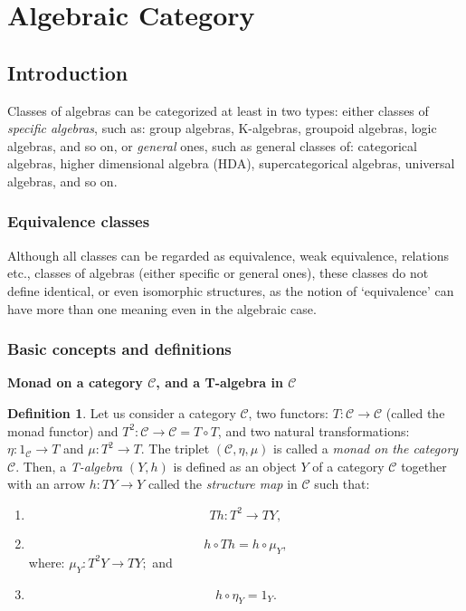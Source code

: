 \documentclass[12pt]{article}
\theoremstyle{plain}
\theoremstyle{definition}
\newtheorem{definition}{Definition}[section]
\numberwithin{equation}{section}
\begin{document}
\section{Algebraic Category}

\subsection{Introduction}
Classes of algebras can be categorized at least in two types: either classes of \emph{specific
algebras}, such as: group algebras, K-algebras, groupoid algebras, logic algebras, and so on,
or \emph{general} ones, such as general classes of: categorical algebras, higher dimensional algebra
(HDA), supercategorical algebras, universal algebras, and so on.
\subsubsection{Equivalence classes}
Although all classes can be regarded as equivalence, weak equivalence, relations etc., classes of
algebras (either specific or general ones), these classes do not define identical, or even isomorphic structures, as the notion of `equivalence' can have more than one meaning even in the algebraic case.

\subsubsection{Basic concepts and definitions}

{\bf Monad on a category $\mathcal{C}$, and a T-algebra in $\mathcal{C}$}

\begin{definition}
Let us consider a category $\mathcal{C}$, two functors: $T: \mathcal{C} \to \mathcal{C}$ (called the monad functor) and $T^2: \mathcal{C} \to \mathcal{C} = T \circ T$, and two natural transformations:
$\eta: 1_ \mathcal{C} \to T$ and $\mu: T^2 \to T$. The triplet $(\mathcal{C},\eta,\mu)$
is called a {\em monad on the category $\mathcal{C}$}. Then, a {\em T-algebra} $(Y,h)$ is defined as an object $Y$ of a category $\mathcal{C}$ together with an arrow $h: TY \to Y $ called the {\em structure map} in $\mathcal{C}$ such that:

\begin{enumerate}
\item $$Th: T^2 \to TY,$$

\item $$h \circ Th = h \circ \mu_Y,$$
where: $\mu_Y: T^2 Y \to TY;$ and

\item $$ h \circ \eta_Y = 1_Y.$$
\end{enumerate}

\end{definition}
\end{document}
